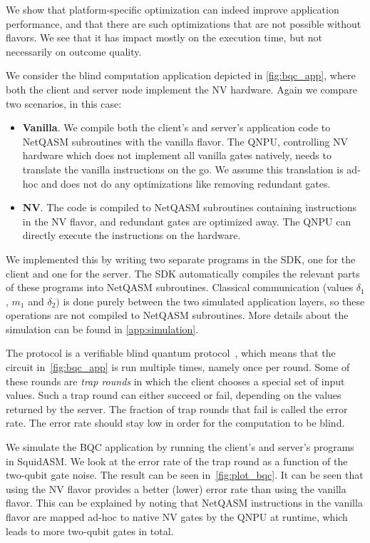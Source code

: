 We show that platform-specific optimization can indeed improve application performance, and that there are such optimizations that are not possible without flavors.
We see that it has impact mostly on the execution time, but not necessarily on outcome quality.

We consider the blind computation application depicted in \cref{fig:bqc_app}, where both the client and server node implement the NV hardware.
Again we compare two scenarios, in this case:
\begin{itemize}
  \item \textbf{Vanilla}.
        We compile both the client's and server's application code to \ac{NetQASM} subroutines with the vanilla flavor.
        The \ac{QNPU}, controlling NV hardware which does not implement all vanilla gates natively, needs to translate the vanilla instructions on the go.
        We assume this translation is ad-hoc and does not do any optimizations like removing redundant gates.
  \item \textbf{NV}.
        The code is compiled to \ac{NetQASM} subroutines containing instructions in the NV flavor, and redundant gates are optimized away.
        The \ac{QNPU} can directly execute the instructions on the hardware.
\end{itemize}

We implemented this by writing two separate programs in the SDK, one for the client and one for the server.
The SDK automatically compiles the relevant parts of these programs into \ac{NetQASM} subroutines.
Classical communication (values $\delta_1$, $m_1$ and $\delta_2)$ is done purely between the two simulated application layers, so these operations are not compiled to \ac{NetQASM} subroutines.
More details about the simulation can be found in \cref{app:simulation}.

The protocol is a verifiable blind quantum protocol~\cite{fitzsimons2017unconditionally}, which means that the circuit in~\cref{fig:bqc_app} is run multiple times, namely once per round.
Some of these rounds are \textit{trap rounds} in which the client chooses a special set of input values.
Such a trap round can either succeed or fail, depending on the values returned by the server.
The fraction of trap rounds that fail is called the error rate.
The error rate should stay low in order for the computation to be blind.

We simulate the BQC application by running the client's and server's programs in SquidASM.
We look at the error rate of the trap round as a function of the two-qubit gate noise.
The result can be seen in~\cref{fig:plot_bqc}.
It can be seen that using the NV flavor provides a better (lower) error rate than using the vanilla flavor.
This can be explained by noting that \ac{NetQASM} instructions in the vanilla flavor are mapped ad-hoc to native NV gates by the \ac{QNPU} at runtime, which leads to more two-qubit gates in total.


